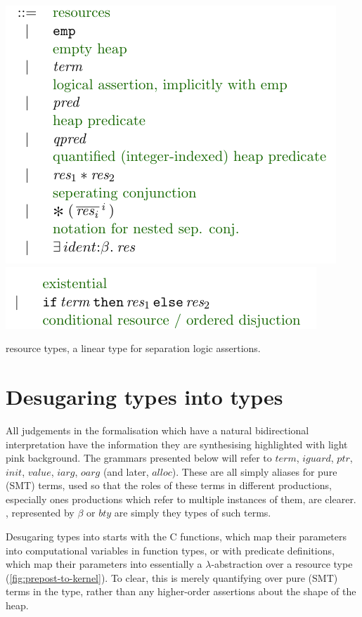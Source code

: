 \begin{marginfigure}
    \centering
    \includegraphics{figures/kernel-res-1}
    \includegraphics{figures/kernel-res-2}
    \caption{ resource types, a linear type for separation logic
        assertions.}\label{fig:kernel-res}
\end{marginfigure}

\section{Desugaring  types into  types}\label{sec:desugaring}

All judgements in the formalisation which have a natural bidirectional
interpretation have the information they are synthesising highlighted with
\colorbox{pink!30}{light pink} background. The grammars presented below will
refer to ${term}$, ${iguard}$, ${ptr}$, ${init}$, ${value}$, ${iarg}$, ${oarg}$
(and later, ${alloc}$). These are all simply aliases for pure (SMT) terms, used
so that the roles of these terms in different productions, especially ones
productions which refer to multiple instances of them, are clearer. , represented by $\beta$ or ${bty}$ are simply they types of such terms.

Desugaring  types into  starts with the C functions, which
map their parameters into computational variables in function types, or with
predicate definitions, which map their parameters into essentially a
$\lambda$-abstraction over a resource type (\cref{fig:prepost-to-kernel}). To
clear, this is merely quantifying over pure (SMT) terms in the type, rather
than any higher-order assertions about the shape of the heap.

